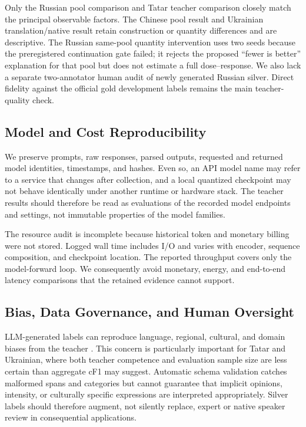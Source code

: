 Only the Russian pool comparison and Tatar teacher comparison closely
match the principal observable factors. The Chinese pool result and
Ukrainian translation/native result retain construction or quantity
differences and are descriptive. The Russian same-pool quantity
intervention uses two seeds because the preregistered continuation gate
failed; it rejects the proposed ``fewer is better'' explanation for that
pool but does not estimate a full dose--response. We also lack a
separate two-annotator human audit of newly generated Russian silver.
Direct fidelity against the official gold development labels remains the
main teacher-quality check.

\subsection{Model and Cost
Reproducibility}\label{model-and-cost-reproducibility}

We preserve prompts, raw responses, parsed outputs, requested and
returned model identities, timestamps, and hashes. Even so, an API model
name may refer to a service that changes after collection, and a local
quantized checkpoint may not behave identically under another runtime or
hardware stack. The teacher results should therefore be read as
evaluations of the recorded model endpoints and settings, not immutable
properties of the model families.

The resource audit is incomplete because historical token and monetary
billing were not stored. Logged wall time includes I/O and varies with
encoder, sequence composition, and checkpoint location. The reported
throughput covers only the model-forward loop. We consequently avoid
monetary, energy, and end-to-end latency comparisons that the retained
evidence cannot support.

\subsection{Bias, Data Governance, and Human
Oversight}\label{bias-data-governance-and-human-oversight}

LLM-generated labels can reproduce language, regional, cultural, and
domain biases from the teacher
\citep{cui2025bias,jadhav2025limitations}. This concern is particularly
important for Tatar and Ukrainian, where both teacher competence and
evaluation sample size are less certain than aggregate cF1 may suggest.
Automatic schema validation catches malformed spans and categories but
cannot guarantee that implicit opinions, intensity, or culturally
specific expressions are interpreted appropriately. Silver labels should
therefore augment, not silently replace, expert or native speaker review
in consequential applications.

